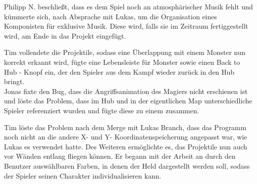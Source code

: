 Philipp N. beschließt, dass es dem Spiel noch an atmosphärischer Musik fehlt und kümmerte sich, nach Absprache mit Lukas, um die Organisation eines Komponisten für exklusive Musik. Diese wird, falls sie im Zeitraum fertiggestellt wird, am Ende in das Projekt eingefügt. \\


Tim vollendete die Projektile, sodass eine Überlappung mit einem Monster nun korrekt erkannt wird, fügte eine Lebensleiste für Monster sowie einen \glqq{}Back to Hub\grqq{} - Knopf ein, der den Spieler aus dem Kampf wieder zurück in den Hub bringt. \\
Jonas fixte den Bug, dass die Angriffsanimation des Magiers nicht erschienen ist und löste das Problem, dass im Hub und in der eigentlichen Map unterschiedliche Spieler referenziert wurden und fügte diese zu einem zusammen. \\


Tim löste das Problem nach dem Merge mit Lukas Branch, dass das Programm noch nicht an die andere X- und Y- Koordinatenspeicherung angepasst war, wie Lukas es verwendet hatte. Des Weiteren ermöglichte es, das Projektile nun auch vor Wänden entlang fliegen können. Er begann mit der Arbeit an durch den Benutzer auswählbaren Farben, in denen der Held dargestellt werden soll, sodass der Spieler seinen Charakter individualisieren kann. \\


